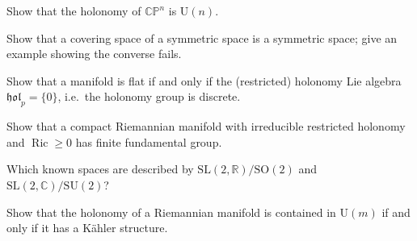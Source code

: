 \begin{remark}
  \label{rem:pet-ch10-exercise-cpn-holonomy}

  Show that the holonomy of $\mathbb{CP}^n$ is $\mathrm U(n)$.
\end{remark}

\begin{remark}
  \label{rem:pet-ch10-exercise-covering-symmetric}

  Show that a covering space of a symmetric space is a symmetric space; give an
  example showing the converse fails.
\end{remark}

\begin{remark}
  \label{rem:pet-ch10-exercise-flat-discrete-holonomy}

  Show that a manifold is flat if and only if the (restricted) holonomy Lie
  algebra $\mathfrak{hol}_p=\{0\}$, i.e.\ the holonomy group is discrete.
\end{remark}

\begin{remark}
  \label{rem:pet-ch10-exercise-finite-fundamental-group}

  Show that a compact Riemannian manifold with irreducible restricted holonomy
  and $\operatorname{Ric}\ge0$ has finite fundamental group.
\end{remark}

\begin{remark}
  \label{rem:pet-ch10-exercise-sl2-quotients}

  Which known spaces are described by $\mathrm{SL}(2,\mathbb R)/\mathrm{SO}(2)$ and
  $\mathrm{SL}(2,\mathbb C)/\mathrm{SU}(2)$?
\end{remark}

\begin{remark}
  \label{rem:pet-ch10-exercise-kahler-unitary-holonomy}

  Show that the holonomy of a Riemannian manifold is contained in $\mathrm U(m)$
  if and only if it has a Kähler structure.
\end{remark}

